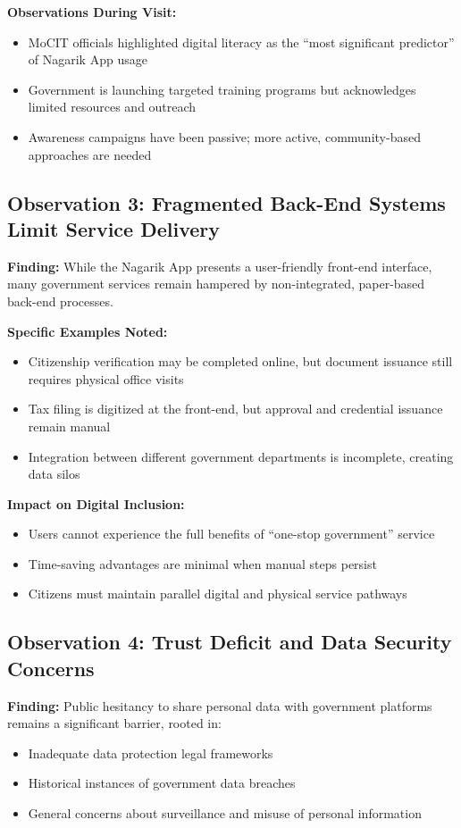 \documentclass[12pt,a4paper]{article}
\begin{document}
\textbf{Observations During Visit:}
\begin{itemize}
    \item MoCIT officials highlighted digital literacy as the ``most significant predictor'' of Nagarik App usage
    \item Government is launching targeted training programs but acknowledges limited resources and outreach
    \item Awareness campaigns have been passive; more active, community-based approaches are needed
\end{itemize}

\subsection{Observation 3: Fragmented Back-End Systems Limit Service Delivery}

\textbf{Finding:} While the Nagarik App presents a user-friendly front-end interface, many government services remain hampered by non-integrated, paper-based back-end processes.

\textbf{Specific Examples Noted:}
\begin{itemize}
    \item Citizenship verification may be completed online, but document issuance still requires physical office visits
    \item Tax filing is digitized at the front-end, but approval and credential issuance remain manual
    \item Integration between different government departments is incomplete, creating data silos
\end{itemize}

\textbf{Impact on Digital Inclusion:}
\begin{itemize}
    \item Users cannot experience the full benefits of ``one-stop government'' service
    \item Time-saving advantages are minimal when manual steps persist
    \item Citizens must maintain parallel digital and physical service pathways
\end{itemize}

\subsection{Observation 4: Trust Deficit and Data Security Concerns}

\textbf{Finding:} Public hesitancy to share personal data with government platforms remains a significant barrier, rooted in:
\begin{itemize}
    \item Inadequate data protection legal frameworks
    \item Historical instances of government data breaches
    \item General concerns about surveillance and misuse of personal information
\end{itemize}
\end{document}
